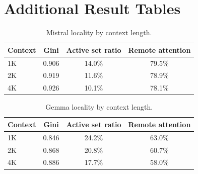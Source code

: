 \documentclass[11pt]{article}
\newcommand{\pct}{\%}
\theoremstyle{definition}
\theoremstyle{plain}
\begin{document}
\appendix

\section{Additional Result Tables}
\label{app:tables}

\begin{table}[h]
\centering
\caption{Mistral locality by context length.}
\small
\begin{tabular}{lccc}
\toprule
Context & Gini & Active set ratio & Remote attention \\
\midrule
1K & 0.906 & 14.0\pct{} & 79.5\pct{} \\
2K & 0.919 & 11.6\pct{} & 78.9\pct{} \\
4K & 0.926 & 10.1\pct{} & 78.1\pct{} \\
\bottomrule
\end{tabular}
\end{table}

\begin{table}[h]
\centering
\caption{Gemma locality by context length.}
\small
\begin{tabular}{lccc}
\toprule
Context & Gini & Active set ratio & Remote attention \\
\midrule
1K & 0.846 & 24.2\pct{} & 63.0\pct{} \\
2K & 0.868 & 20.8\pct{} & 60.7\pct{} \\
4K & 0.886 & 17.7\pct{} & 58.0\pct{} \\
\bottomrule
\end{tabular}
\end{table}



\end{document}
